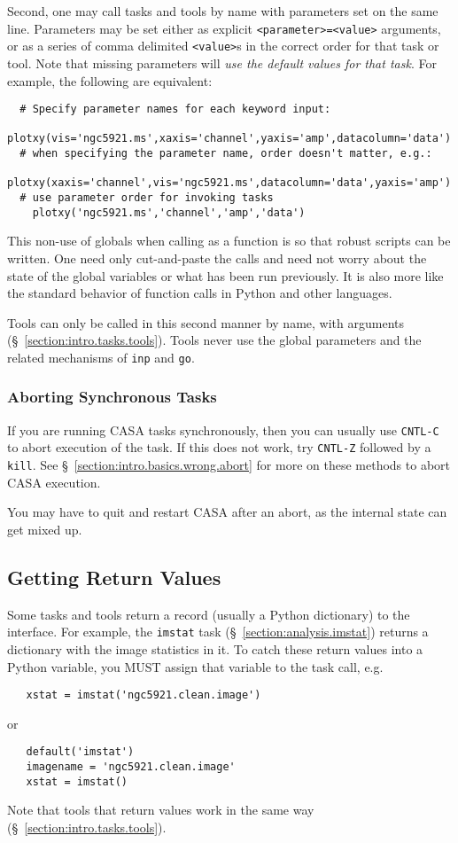 Second, one may call tasks and tools by name with parameters set
on the same line.  Parameters may be set either as explicit
{\tt <parameter>=<value>} arguments, or as a series of comma delimited
{\tt <value>}s in the correct order for that task or tool.  Note that missing
parameters will {\em use the default values for that task}.
For example, the following are equivalent:
\small
\begin{verbatim}
  # Specify parameter names for each keyword input: 
    plotxy(vis='ngc5921.ms',xaxis='channel',yaxis='amp',datacolumn='data')
  # when specifying the parameter name, order doesn't matter, e.g.:
    plotxy(xaxis='channel',vis='ngc5921.ms',datacolumn='data',yaxis='amp')
  # use parameter order for invoking tasks
    plotxy('ngc5921.ms','channel','amp','data')
\end{verbatim}
\normalsize
This non-use of globals when calling as a function is so that robust 
scripts can be written.  One need only cut-and-paste the calls and
need not worry about the state of the global variables or what has
been run previously.  It is also more like the standard behavior of
function calls in Python and other languages.

Tools can only be called in this second manner by name, with
arguments (\S~\ref{section:intro.tasks.tools}).  Tools never use the
global parameters and the related mechanisms of {\tt inp} and {\tt go}.

\subsubsection{Aborting Synchronous Tasks}
\label{section:intro.tasks.run.abort}

If you are running CASA tasks synchronously, then you can usually use
{\tt CNTL-C} to abort execution of the task.  If this does not work,
try {\tt CNTL-Z} followed by a {\tt kill}.
See \S~\ref{section:intro.basics.wrong.abort} for more on these
methods to abort CASA execution.

You may have to quit and restart CASA after an abort, as the internal
state can get mixed up.

\subsection{Getting Return Values}
\label{section:intro.tasks.return}

Some tasks and tools return a record (usually a Python dictionary)
to the interface.  For example, the {\tt imstat} task 
(\S~\ref{section:analysis.imstat}) returns a dictionary with the
image statistics in it.  To catch these return values into a
Python variable, you MUST assign that variable to the task call, e.g.
\small
\begin{verbatim}
   xstat = imstat('ngc5921.clean.image')
\end{verbatim}
\normalsize
or 
\small
\begin{verbatim}
   default('imstat')
   imagename = 'ngc5921.clean.image'
   xstat = imstat()
\end{verbatim}
\normalsize
Note that tools that return values work in the same way
(\S~\ref{section:intro.tasks.tools}).


